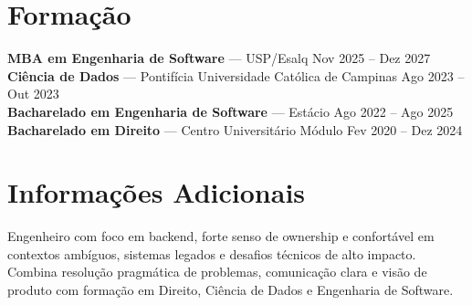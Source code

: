 \documentclass[11pt,a4paper]{article}
\begin{document}
\section*{Formação}

\textbf{MBA em Engenharia de Software} — USP/Esalq \hfill Nov 2025 – Dez 2027 \\

\textbf{Ciência de Dados} — Pontifícia Universidade Católica de Campinas \hfill Ago 2023 – Out 2023 \\

\textbf{Bacharelado em Engenharia de Software} — Estácio \hfill Ago 2022 – Ago 2025 \\

\textbf{Bacharelado em Direito} — Centro Universitário Módulo \hfill Fev 2020 – Dez 2024 \\

\section*{Informações Adicionais}
Engenheiro com foco em backend, forte senso de ownership e confortável em contextos ambíguos, sistemas legados e desafios técnicos de alto impacto. Combina resolução pragmática de problemas, comunicação clara e visão de produto com formação em Direito, Ciência de Dados e Engenharia de Software.
\end{document}
